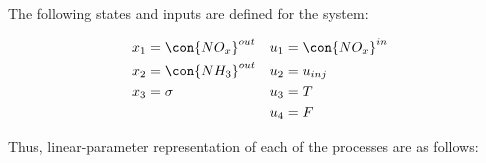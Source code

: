 The following states and inputs are defined for the system:

\begin{align*}
    x_1 &= \con{NO_x}^{out} & u_1 &= \con{NO_x}^{in} \\
    x_2 &= \con{NH_3}^{out} & u_2 &= u_{inj} \\
    x_3 &= \sigma & u_3 &= T\\
        &         & u_4 &= F
\end{align*}

Thus, linear-parameter representation of each of the processes are as follows:













